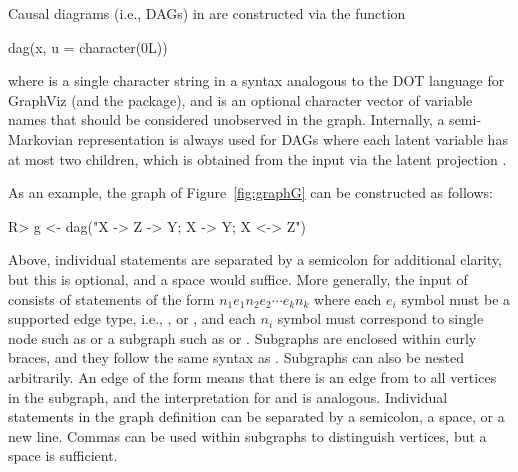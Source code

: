 Causal diagrams (i.e., DAGs) in  are constructed via the function 
\begin{example}
dag(x, u = character(0L)) 
\end{example}
where  is a single character string in a syntax analogous to the DOT language for GraphViz (and the  package), and  is an optional character vector of variable names that should be considered unobserved in the graph. Internally, a semi-Markovian representation is always used for DAGs where each latent variable has at most two children, which is obtained from the input via the latent projection \citep{verma1990}.

As an example, the graph of Figure~\ref{fig:graphG} can be constructed as follows:
\begin{example}
R> g <- dag("X -> Z -> Y; X -> Y; X <-> Z")
\end{example}
Above, individual statements are separated by a semicolon for additional clarity, but this is optional, and a space would suffice. More generally, the input of  consists of statements of the form \(n_1 e_1 n_2 e_2 \cdots e_k n_k\) where each \(e_i\) symbol must be a supported edge type, i.e., \code{->}, \code{<-} or \code{<->}, and each \(n_i\) symbol must correspond to single node such as  or a subgraph such as  or . Subgraphs are enclosed within curly braces, and they follow the same syntax as . Subgraphs can also be nested arbitrarily. An edge of the form  means that there is an edge from  to all vertices in the subgraph, and the interpretation for \code{<-} and \code{<->} is analogous. Individual statements in the graph definition can be separated by a semicolon, a space, or a new line. Commas can be used within subgraphs to distinguish vertices, but a space is sufficient.

